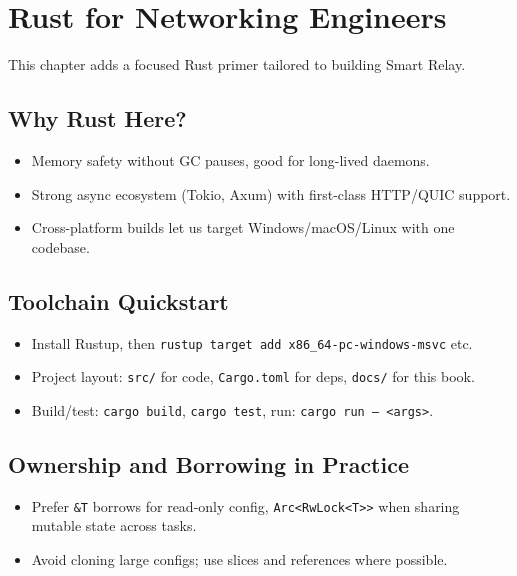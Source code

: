\chapter{Rust for Networking Engineers}

This chapter adds a focused Rust primer tailored to building Smart Relay.

\section{Why Rust Here?}
\begin{itemize}
    \item Memory safety without GC pauses, good for long-lived daemons.
    \item Strong async ecosystem (Tokio, Axum) with first-class HTTP/QUIC support.
    \item Cross-platform builds let us target Windows/macOS/Linux with one codebase.
\end{itemize}

\section{Toolchain Quickstart}
\begin{itemize}
    \item Install Rustup, then \texttt{rustup target add x86\_64-pc-windows-msvc} etc.
    \item Project layout: \texttt{src/} for code, \texttt{Cargo.toml} for deps, \texttt{docs/} for this book.
    \item Build/test: \texttt{cargo build}, \texttt{cargo test}, run: \texttt{cargo run -- <args>}.
\end{itemize}

\section{Ownership and Borrowing in Practice}
\begin{itemize}
    \item Prefer \texttt{\&T} borrows for read-only config, \texttt{Arc<RwLock<T>>} when sharing mutable state across tasks.
    \item Avoid cloning large configs; use slices and references where possible.
\end{itemize}

